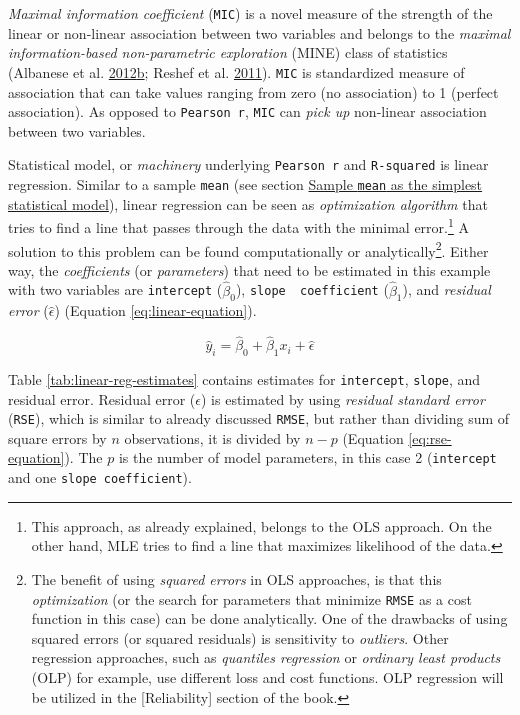 \documentclass[
]{book}
\begin{document}
\emph{Maximal information coefficient} (\texttt{MIC}) is a novel measure of the strength of the linear or non-linear association between two variables and belongs to the \emph{maximal information-based non-parametric exploration} (MINE) class of statistics (Albanese et al. \protect\hyperlink{ref-albaneseMinervaMinepyEngine2012}{2012}\protect\hyperlink{ref-albaneseMinervaMinepyEngine2012}{b}; Reshef et al. \protect\hyperlink{ref-reshefDetectingNovelAssociations2011}{2011}). \texttt{MIC} is standardized measure of association that can take values ranging from zero (no association) to 1 (perfect association). As opposed to \texttt{Pearson\ r}, \texttt{MIC} can \emph{pick up} non-linear association between two variables.

Statistical model, or \emph{machinery} underlying \texttt{Pearson\ r} and \texttt{R-squared} is linear regression. Similar to a sample \texttt{mean} (see section \protect\hyperlink{sample-mean-as-the-simplest-statistical-model}{Sample \texttt{mean} as the simplest statistical model}), linear regression can be seen as \emph{optimization algorithm} that tries to find a line that passes through the data with the minimal error.\footnote{This approach, as already explained, belongs to the OLS approach. On the other hand, MLE tries to find a line that maximizes likelihood of the data.} A solution to this problem can be found computationally or analytically\footnote{The benefit of using \emph{squared errors} in OLS approaches, is that this \emph{optimization} (or the search for parameters that minimize \texttt{RMSE} as a cost function in this case) can be done analytically. One of the drawbacks of using squared errors (or squared residuals) is sensitivity to \emph{outliers}. Other regression approaches, such as \emph{quantiles regression} or \emph{ordinary least products} (OLP) for example, use different loss and cost functions. OLP regression will be utilized in the {[}Reliability{]} section of the book.}. Either way, the \emph{coefficients} (or \emph{parameters}) that need to be estimated in this example with two variables are \texttt{intercept} (\(\hat{\beta}_0\)), \texttt{slope\ \ coefficient} (\(\hat{\beta}_1\)), and \emph{residual error} (\(\hat{\epsilon}\)) (Equation \eqref{eq:linear-equation}).

\begin{equation}
  \hat{y}_i = \hat{\beta}_0 + \hat{\beta}_1 x_i + \hat{\epsilon}
  \label{eq:linear-equation}
\end{equation}

Table \ref{tab:linear-reg-estimates} contains estimates for \texttt{intercept}, \texttt{slope}, and residual error. Residual error (\(\epsilon\)) is estimated by using \emph{residual standard error} (\texttt{RSE}), which is similar to already discussed \texttt{RMSE}, but rather than dividing sum of square errors by \(n\) observations, it is divided by \(n-p\) (Equation \eqref{eq:rse-equation}). The \(p\) is the number of model parameters, in this case 2 (\texttt{intercept} and one \texttt{slope\ coefficient}).
\end{document}
